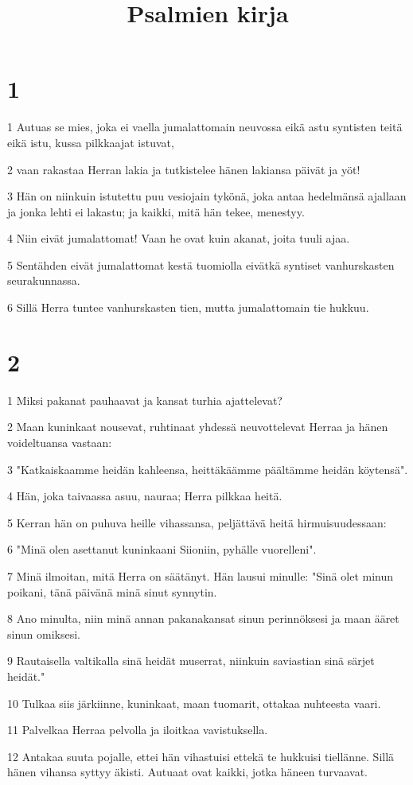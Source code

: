 

\title{Psalmien kirja}


\chapter{1}

\par 1 Autuas se mies, joka ei vaella jumalattomain neuvossa eikä astu syntisten teitä eikä istu, kussa pilkkaajat istuvat,
\par 2 vaan rakastaa Herran lakia ja tutkistelee hänen lakiansa päivät ja yöt!
\par 3 Hän on niinkuin istutettu puu vesiojain tykönä, joka antaa hedelmänsä ajallaan ja jonka lehti ei lakastu; ja kaikki, mitä hän tekee, menestyy.
\par 4 Niin eivät jumalattomat! Vaan he ovat kuin akanat, joita tuuli ajaa.
\par 5 Sentähden eivät jumalattomat kestä tuomiolla eivätkä syntiset vanhurskasten seurakunnassa.
\par 6 Sillä Herra tuntee vanhurskasten tien, mutta jumalattomain tie hukkuu.

\chapter{2}

\par 1 Miksi pakanat pauhaavat ja kansat turhia ajattelevat?
\par 2 Maan kuninkaat nousevat, ruhtinaat yhdessä neuvottelevat Herraa ja hänen voideltuansa vastaan:
\par 3 "Katkaiskaamme heidän kahleensa, heittäkäämme päältämme heidän köytensä".
\par 4 Hän, joka taivaassa asuu, nauraa; Herra pilkkaa heitä.
\par 5 Kerran hän on puhuva heille vihassansa, peljättävä heitä hirmuisuudessaan:
\par 6 "Minä olen asettanut kuninkaani Siioniin, pyhälle vuorelleni".
\par 7 Minä ilmoitan, mitä Herra on säätänyt. Hän lausui minulle: "Sinä olet minun poikani, tänä päivänä minä sinut synnytin.
\par 8 Ano minulta, niin minä annan pakanakansat sinun perinnöksesi ja maan ääret sinun omiksesi.
\par 9 Rautaisella valtikalla sinä heidät muserrat, niinkuin saviastian sinä särjet heidät."
\par 10 Tulkaa siis järkiinne, kuninkaat, maan tuomarit, ottakaa nuhteesta vaari.
\par 11 Palvelkaa Herraa pelvolla ja iloitkaa vavistuksella.
\par 12 Antakaa suuta pojalle, ettei hän vihastuisi ettekä te hukkuisi tiellänne. Sillä hänen vihansa syttyy äkisti. Autuaat ovat kaikki, jotka häneen turvaavat.

